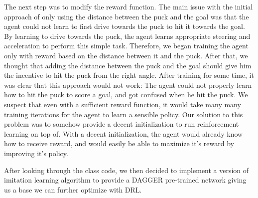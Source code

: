 \documentclass[10pt,twocolumn,letterpaper]{article}
\begin{document}
The next step was to modify the reward function. The main issue with the initial approach of only using the distance between the puck and the goal was that the agent could not learn to first drive towards the puck to hit it towards the goal. By learning to drive towards the puck, the agent learns appropriate steering and acceleration to perform this simple task. Therefore, we began training the agent only with reward based on the distance between it and the puck. After that, we thought that adding the distance between the puck and the goal should give him the incentive to hit the puck from the right angle. After training for some time, it was clear that this approach would not work: The agent could not properly learn how to hit the puck to score a goal, and got confused when he hit the puck. We suspect that even with a sufficient reward function, it would take many many training iterations for the agent to learn a sensible policy. Our solution to this problem was to somehow provide a decent initialization to run reinforcement learning on top of. With a decent initialization, the agent would already know how to receive reward, and would easily be able to maximize it’s reward by improving it’s policy.

After looking through the class code, we then decided to implement a version of imitation learning algorithm to provide a DAGGER pre-trained network giving us a base we can further optimize with DRL.
\end{document}
